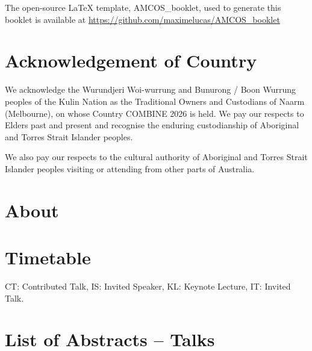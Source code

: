\documentclass[openany, parskip=full, 12pt, a4]{scrbook}
\begin{document}
	
	
\mbox{}
\thispagestyle{empty}
\vfill
\begin{center}
	The open-source \LaTeX{} template, AMCOS\_booklet, used to generate this booklet is available at \url{https://github.com/maximelucas/AMCOS\_booklet}
\end{center}

\newpage

\tableofcontents

\chapter{Acknowledgement of Country}
We acknowledge the Wurundjeri Woi-wurrung and Bunurong / Boon Wurrung peoples of the Kulin Nation as the Traditional Owners and Custodians of Naarm (Melbourne), on whose Country COMBINE 2026 is held.  We pay our respects to Elders past and present and recognise the enduring custodianship of Aboriginal and Torres Strait Islander peoples. 

We also pay our respects to the cultural authority of Aboriginal and Torres Strait Islander peoples visiting or attending from other parts of Australia.


\chapter{About}



\chapter{Timetable}

CT: Contributed Talk, IS: Invited Speaker, KL: Keynote Lecture, IT: Invited Talk.


\chapter{List of Abstracts -- Talks}
\end{document}
